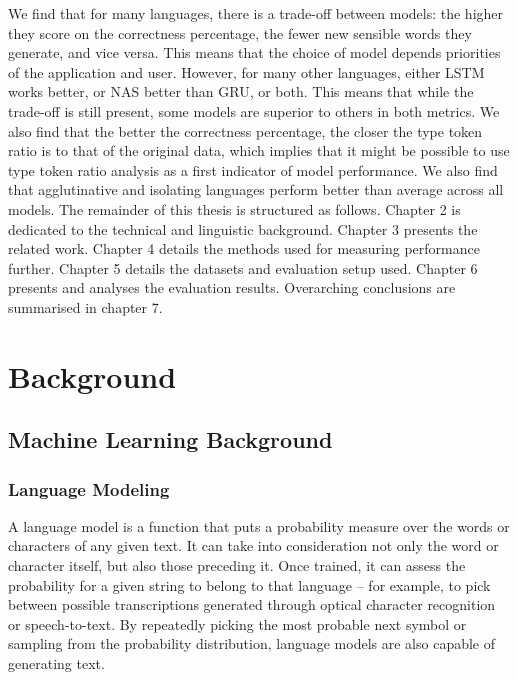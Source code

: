 \documentclass[11pt,a4paper,twoside,openright]{scrbook}
\begin{document}
We find that for many languages, there is a trade-off between models: the higher they score on the correctness percentage, the fewer new sensible words they generate, and vice versa. This means that the choice of model depends priorities of the application and user. However, for many other languages, either LSTM works better, or NAS better than GRU, or both. This means that while the trade-off is still present, some models are superior to others in both metrics. We also find that the better the correctness percentage, the closer the type token ratio is to that of the original data, which implies that it might be possible to use type token ratio analysis as a first indicator of model performance. We also find that agglutinative and isolating languages perform better than average across all models. 
The remainder of this thesis is structured as follows. Chapter 2 is dedicated to the technical and linguistic background. Chapter 3 presents the related work. Chapter 4 details the methods used for measuring performance further. Chapter 5 details the datasets and evaluation setup used. Chapter 6 presents and analyses the evaluation results. Overarching conclusions are summarised in chapter 7.


\chapter{Background}

\section{Machine Learning Background}
\subsection{Language Modeling}
A language model is a function that puts a probability measure over the words or characters of any given text. It can take into consideration not only the word or character itself, but also those preceding it.  Once trained, it can assess the probability for a given string to belong to that language – for example, to pick between possible transcriptions generated through optical character recognition or speech-to-text. By repeatedly picking the most probable next symbol or sampling from the probability distribution, language models are also capable of generating text.
\cite{irbook}
\end{document}
